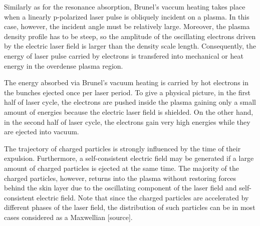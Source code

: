Similarly as for the resonance absorption, Brunel's vaccum heating takes place when a linearly p-polarized laser pulse is obliquely incident on a plasma. In this case, however, the incident angle must be relatively large. Moreover, the plasma density profile has to be steep, so the amplitude of the oscillating electrons driven by the electric laser field is larger than the density scale length. Consequently, the energy of laser pulse carried by electrons is transfered into mechanical or heat energy in the overdense plasma region.

The energy absorbed via Brunel's vacuum heating is carried by hot electrons in the bunches
ejected once per laser period. To give a physical picture, in the first half of laser cycle, the electrons are pushed inside the plasma gaining only a small amount of energies because the electric laser field is shielded. On the other hand, in the second half of laser cycle, the electrons gain very high energies while they are ejected into vacuum.

The trajectory of charged particles is strongly influenced by the time of their expulsion. Furthermore, a self-consistent electric field may be generated if a large amount of charged particles is ejected at the same time. The majority of the charged particles, however, returns into the plasma without restoring forces behind the skin layer due to the oscillating component of the laser field and self-consistent electric field. Note that since the charged particles are accelerated by different phases of the laser field, the distribution of such particles can be in most cases considered as a Maxwellian [source].